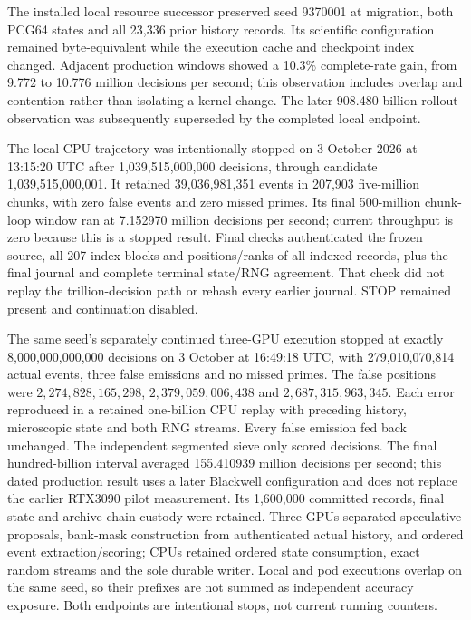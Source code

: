 The installed local resource successor preserved seed 9370001 at migration, both PCG64 states and all 23,336 prior history records. Its scientific configuration remained byte-equivalent while the execution cache and checkpoint index changed. Adjacent production windows showed a 10.3\% complete-rate gain, from 9.772 to 10.776 million decisions per second; this observation includes overlap and contention rather than isolating a kernel change. The later 908.480-billion rollout observation was subsequently superseded by the completed local endpoint.

The local CPU trajectory was intentionally stopped on 3 October 2026 at 13:15:20 UTC after 1,039,515,000,000 decisions, through candidate 1,039,515,000,001. It retained 39,036,981,351 events in 207,903 five-million chunks, with zero false events and zero missed primes. Its final 500-million chunk-loop window ran at 7.152970 million decisions per second; current throughput is zero because this is a stopped result. Final checks authenticated the frozen source, all 207 index blocks and positions/ranks of all indexed records, plus the final journal and complete terminal state/RNG agreement. That check did not replay the trillion-decision path or rehash every earlier journal. STOP remained present and continuation disabled.

The same seed's separately continued three-GPU execution stopped at exactly 8,000,000,000,000 decisions on 3 October at 16:49:18 UTC, with 279,010,070,814 actual events, three false emissions and no missed primes. The false positions were $2{,}274{,}828{,}165{,}298$, $2{,}379{,}059{,}006{,}438$ and $2{,}687{,}315{,}963{,}345$. Each error reproduced in a retained one-billion CPU replay with preceding history, microscopic state and both RNG streams. Every false emission fed back unchanged. The independent segmented sieve only scored decisions. The final hundred-billion interval averaged 155.410939 million decisions per second; this dated production result uses a later Blackwell configuration and does not replace the earlier RTX3090 pilot measurement. Its 1,600,000 committed records, final state and archive-chain custody were retained. Three GPUs separated speculative proposals, bank-mask construction from authenticated actual history, and ordered event extraction/scoring; CPUs retained ordered state consumption, exact random streams and the sole durable writer. Local and pod executions overlap on the same seed, so their prefixes are not summed as independent accuracy exposure. Both endpoints are intentional stops, not current running counters.


